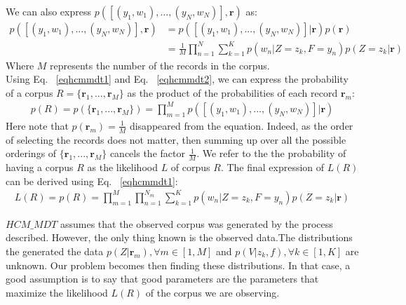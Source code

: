 We can also express $p([(y_{1},w_{1}),...,(y_{N},w_{N})] , \mathbf{r})$ as:
\begin{equation} \label{eqhcmmdt2}
\begin{aligned}
p([(y_{1},w_{1}),...,(y_{N},w_{N})] , \mathbf{r})&=p([(y_{1},w_{1}),...,(y_{N},w_{N})]|\mathbf{r})p(\mathbf{r})\\
&=\frac{1}{M}\prod_{n=1}^{N}\sum_{k=1}^{K}p(w_{n}|Z=z_{k}, F=y_{n})p(Z=z_{k}|\mathbf{r})
\end{aligned}
\end{equation}
Where $M$ represents the number of the records in the corpus.
\\Using Eq. ~\eqref{eqhcmmdt1} and Eq. ~\eqref{eqhcmmdt2}, we can express the probability of a corpus $R=\{\mathbf{r}_{1},...,\mathbf{r}_{M}\}$ as the product of the probabilities of each record $\mathbf{r}_{m}$:
\begin{equation} \label{eqhcmmdt3}
\begin{split}
p(R)=p(\{\mathbf{r}_{1},...,\mathbf{r}_{M}\})=\prod_{m=1}^{M}p([(y_{1},w_{1}),...,(y_{N},w_{N})]|\mathbf{r})
\end{split}
\end{equation}
Here note that $p(\mathbf{r}_{m})=\frac{1}{M}$ disappeared from the equation. Indeed, as the order of selecting the records does not matter, then summing up over all the possible orderings of $\{\mathbf{r}_{1},...,\mathbf{r}_{M}\}$ cancels the factor $\frac{1}{M}$. We refer to the the probability of having a corpus $R$ as the likelihood $L$ of corpus $R$. The final expression of $L(R)$ can be derived using Eq. ~\eqref{eqhcmmdt1}:
\begin{equation} \label{eqhcmmdt4}
\begin{split}
L(R)=p(R)=\prod_{m=1}^{M}\prod_{n=1}^{N_{m}}\sum_{k=1}^{K}p(w_{n}|Z=z_{k}, F=y_{n})p(Z=z_{k}|\mathbf{r})
\end{split}
\end{equation} \par

$HCM\_MDT$ assumes that the observed corpus was generated by the process described. However, the only thing known is the observed data.The distributions the generated the data  $p(Z|\mathbf{r}_{m}),\forall m \in [1,M]$ and $p(V|z_{k},f), \forall k \in [1,K]$ are unknown. Our problem becomes then finding these distributions. In that case, a good assumption is to say that good parameters are the parameters that maximize the likelihood $L(R)$ of the corpus we are observing. \par

